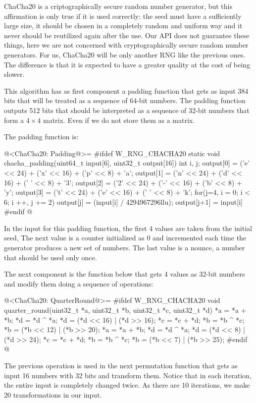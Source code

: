 
ChaCha20 is a criptographically secure random number generator, but
this affirmation is only true if it is used correctly: the seed must
have a sufficiently large size, it should be chosen in a completely
random and uniform way and it never should be reutilized again after
the use. Our API does not guarantee these things, here we are not
concerned with cryptographically secure random number generators. For
us, ChaCha20 will be only another RNG like the previous ones. The
difference is that it is expected to have a greater quality at the
cost of being slower.

This algorithm has as first component a padding function that gets as
input 384 bits that will be treated as a sequence of 64-bit
numbers. The padding function outputs 512 bits that should be
interpreted as a sequence of 32-bit numbers that form a $4\times 4$
matrix. Even if we do not store them as a matrix.

The padding function is:

@<ChaCha20: Padding@>=
#ifdef W_RNG_CHACHA20
static void chacha_padding(uint64_t input[6], uint32_t output[16]){
  int i, j;
  output[0] = ('e' << 24) + ('x' << 16) + ('p' << 8) + 'a';
  output[1] = ('n' << 24) + ('d' << 16) + (' ' << 8) + '3';
  output[2] = ('2' << 24) + ('-' << 16) + ('b' << 8) + 'y';
  output[3] = ('t' << 24) + ('e' << 16) + (' ' << 8) + 'k';
  for(j=4, i = 0; i < 6; i ++, j += 2){
    output[j] = (input[i] / 4294967296llu);
    output[j+1] = input[i] %
  }
}
#endif
@

In the input for this padding function, the first 4 values are taken
from the initial seed, The next value is a counter initialized as 0
and incremented each time the generator produces a new set of
numbers. The last value is a nounce, a number that should be used only
once.

The next component is the function below that gets 4 values as 32-bit
numbers and modify them doing a sequence of operations:

@<ChaCha20: QuarterRound@>=
#ifdef W_RNG_CHACHA20
void quarter_round(uint32_t *a, uint32_t *b, uint32_t *c, uint32_t *d){
  *a = *a + *b;
  *d = *d ^ *a;
  *d = (*d << 16) | (*d >> 16);
  *c = *c + *d;
  *b = *b ^ *c;
  *b = (*b << 12) | (*b >> 20);
  *a = *a + *b;
  *d = *d ^ *a;
  *d = (*d << 8) | (*d >> 24);
  *c = *c + *d;
  *b = *b ^ *c;
  *b = (*b << 7) | (*b >> 25);
}
#endif
@

The previous operation is used in the next permutation function that
gets as input 16 numbers with 32 bits and transform them. Notice that
in each iteration, the entire input is completely changed twice. As
there are 10 iterations, we make 20 transformations in our input.

